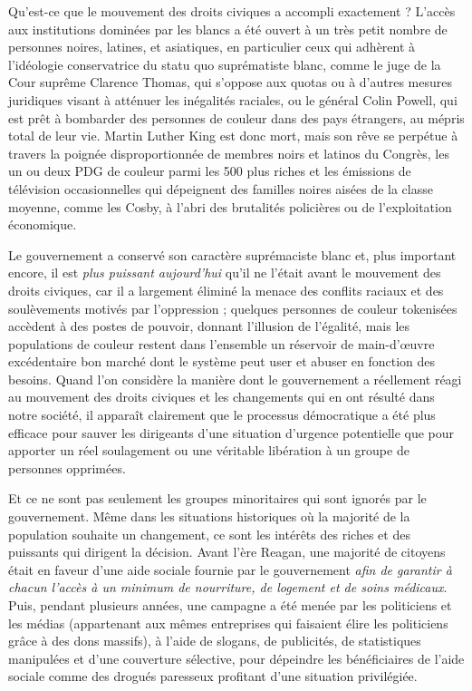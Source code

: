 Qu'est-ce que le mouvement des droits civiques a accompli exactement ? L'accès aux institutions dominées par les blancs a été ouvert à un très petit nombre de personnes noires, latines, et asiatiques, en particulier ceux qui adhèrent à l'idéologie conservatrice du statu quo suprématiste blanc, comme le juge de la Cour suprême Clarence Thomas, qui s'oppose aux quotas ou à d'autres mesures juridiques visant à atténuer les inégalités raciales, ou le général Colin Powell, qui est prêt à bombarder des personnes de couleur dans des pays étrangers, au mépris total de leur vie. Martin Luther King est donc mort, mais son rêve se perpétue à travers la poignée disproportionnée de membres noirs et latinos du Congrès, les un ou deux PDG de couleur parmi les 500 plus riches et les émissions de télévision occasionnelles qui dépeignent des familles noires aisées de la classe moyenne, comme les Cosby, à l'abri des brutalités policières ou de l'exploitation économique.

Le gouvernement a conservé son caractère suprémaciste blanc et, plus important encore, il est \emph{plus puissant aujourd'hui} qu'il ne l'était avant le mouvement des droits civiques, car il a largement éliminé la menace des conflits raciaux et des soulèvements motivés par l'oppression ; quelques personnes de couleur tokenisées accèdent à des postes de pouvoir, donnant l'illusion de l'égalité, mais les populations de couleur restent dans l'ensemble un réservoir de main-d'œuvre excédentaire bon marché dont le système peut user et abuser en fonction des besoins. Quand l'on considère la manière dont le gouvernement a réellement réagi au mouvement des droits civiques et les changements qui en ont résulté dans notre société, il apparaît clairement que le processus démocratique a été plus efficace pour sauver les dirigeants d'une situation d'urgence potentielle que pour apporter un réel soulagement ou une véritable libération à un groupe de personnes opprimées.

Et ce ne sont pas seulement les groupes minoritaires qui sont ignorés par le gouvernement. Même dans les situations historiques où la majorité de la population souhaite un changement, ce sont les intérêts des riches et des puissants qui dirigent la décision. Avant l'ère Reagan, une majorité de citoyens était en faveur d'une aide sociale fournie par le gouvernement \emph{afin de garantir à chacun l'accès à un minimum de nourriture, de logement et de soins médicaux}. Puis, pendant plusieurs années, une campagne a été menée par les politiciens et les médias (appartenant aux mêmes entreprises qui faisaient élire les politiciens grâce à des dons massifs), à l'aide de slogans, de publicités, de statistiques manipulées et d'une couverture sélective, pour dépeindre les bénéficiaires de l'aide sociale comme des drogués paresseux profitant d'une situation privilégiée.

